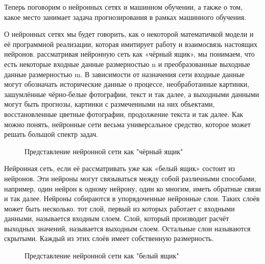 {\cyrillicfont %
\fontsize{13pt}{16.25pt}\selectfont %
\englishfont %

  \par \redline Теперь поговорим о нейронных сетях и машинном обучении, а также о том, какое место занимает задача прогнозирования в рамках машинного обучения. 

  \par \redline О нейронных сетях мы будет говорить, как о некоторой математичкой модели и её программной реализации, которая имитирует работу и взаимосвязь настоящих нейронов.  рассматривая нейронную сеть как «чёрный ящик», мы понимаем, что есть некоторые входные данные размерностью n и преобразованные выходные данные размерностью m. В зависимости от назначения сети входные данные могут обозначать исторические данные о процессе, необработанные картинки, зашумлённые чёрно-белые фотографии, текст и так далее, а выходными данными могут быть прогнозы, картинки с размеченными на них объектами, восстановленные цветные фотографии, продолжение текста и так далее. Как можно понять, нейронные сети весьма универсальное средство, которое может решать большой спектр задач. 

  \begin{figure}
    \centering
    \def\svgwidth{\textwidth}
    
    \caption{Представление нейронной сети как "чёрный ящик"}
    \label{fig:NNBlackBox}
  \end{figure}

  \par \redline Нейронная сеть, если её рассматривать уже как «белый ящик» состоит из нейронов. Эти нейроны могут связываться между собой различными способами, например, один нейрон к одному нейрону, один ко многим, иметь обратные связи и так далее. Нейроны собираются в упорядоченные нейронные слои. Таких слоёв может быть несколько. тот слой, первый из которых работает с входными данными, называется входным слоем. Слой, который производит расчёт выходных значений, называется выходным слоем. Остальные слои называются скрытыми. Каждый из этих слоёв имеет собственную размерность. 

  \begin{figure}
    \centering
    \def\svgwidth{\textwidth}
    
    \caption{Представление нейронной сети как "белый ящик"}
    \label{fig:NNWhiteBox}
  \end{figure}

}
